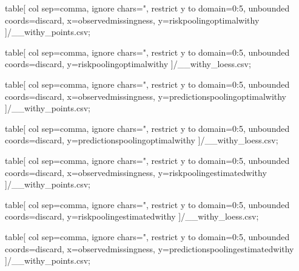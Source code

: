 
\ifx\variant\withyword

  \edef\pointsfile{\tabledir/\scenario_\family_withy_points.csv}
  \edef\loessfile{\tabledir/\scenario_\family_withy_loess.csv}

  table[
    col sep=comma,
    ignore chars={"},
    restrict y to domain=0:5,
    unbounded coords=discard,
    x=observedmissingness,
    y=riskpoolingoptimalwithy
  ]{\pointsfile};

  table[
    col sep=comma,
    ignore chars={"},
    restrict y to domain=0:5,
    unbounded coords=discard,
    y=riskpoolingoptimalwithy
  ]{\loessfile};

  table[
    col sep=comma,
    ignore chars={"},
    restrict y to domain=0:5,
    unbounded coords=discard,
    x=observedmissingness,
    y=predictionspoolingoptimalwithy
  ]{\pointsfile};

  table[
    col sep=comma,
    ignore chars={"},
    restrict y to domain=0:5,
    unbounded coords=discard,
    y=predictionspoolingoptimalwithy
  ]{\loessfile};

  table[
    col sep=comma,
    ignore chars={"},
    restrict y to domain=0:5,
    unbounded coords=discard,
    x=observedmissingness,
    y=riskpoolingestimatedwithy
  ]{\pointsfile};

  table[
    col sep=comma,
    ignore chars={"},
    restrict y to domain=0:5,
    unbounded coords=discard,
    y=riskpoolingestimatedwithy
  ]{\loessfile};

  table[
    col sep=comma,
    ignore chars={"},
    restrict y to domain=0:5,
    unbounded coords=discard,
    x=observedmissingness,
    y=predictionspoolingestimatedwithy
  ]{\pointsfile};

